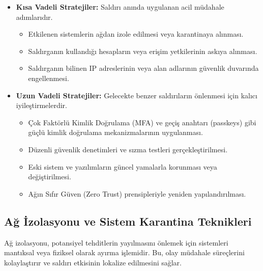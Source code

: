 \begin{itemize}
\begin{itemize}
\begin{itemize}
    \item \textbf{Kısa Vadeli Stratejiler:} Saldırı anında uygulanan acil müdahale adımlarıdır.
    \begin{itemize}
        \item Etkilenen sistemlerin ağdan izole edilmesi veya karantinaya alınması.
        \item Saldırganın kullandığı hesapların veya erişim yetkilerinin askıya alınması.
        \item Saldırganın bilinen IP adreslerinin veya alan adlarının güvenlik duvarında engellenmesi.
    \end{itemize}
    \item \textbf{Uzun Vadeli Stratejiler:} Gelecekte benzer saldırıların önlenmesi için kalıcı iyileştirmelerdir.
    \begin{itemize}
        \item Çok Faktörlü Kimlik Doğrulama (MFA) ve geçiş anahtarı (passkeys) gibi güçlü kimlik doğrulama mekanizmalarının uygulanması.
        \item Düzenli güvenlik denetimleri ve sızma testleri gerçekleştirilmesi.
        \item Eski sistem ve yazılımların güncel yamalarla korunması veya değiştirilmesi.
        \item Ağın Sıfır Güven (Zero Trust) prensipleriyle yeniden yapılandırılması.
    \end{itemize}
\end{itemize}

\subsection{Ağ İzolasyonu ve Sistem Karantina Teknikleri}

Ağ izolasyonu, potansiyel tehditlerin yayılmasını önlemek için sistemleri mantıksal veya fiziksel olarak ayırma işlemidir. Bu, olay müdahale süreçlerini kolaylaştırır ve saldırı etkisinin lokalize edilmesini sağlar.


\end{itemize}
\end{itemize}
